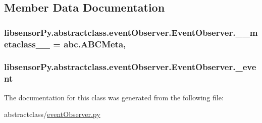\subsection{Member Data Documentation}
\hypertarget{classlibsensorPy_1_1abstractclass_1_1eventObserver_1_1EventObserver_a78c1baeecb96b95af9e0947d62d05450}{}
\subsubsection[{\+\_\+\+\_\+metaclass\+\_\+\+\_\+}]{\setlength{\rightskip}{0pt plus 5cm}libsensor\+Py.\+abstractclass.\+event\+Observer.\+Event\+Observer.\+\_\+\+\_\+metaclass\+\_\+\+\_\+ = abc.\+A\+B\+C\+Meta\hspace{0.3cm}{\ttfamily [static]}, {\ttfamily [private]}}\label{classlibsensorPy_1_1abstractclass_1_1eventObserver_1_1EventObserver_a78c1baeecb96b95af9e0947d62d05450}
\hypertarget{classlibsensorPy_1_1abstractclass_1_1eventObserver_1_1EventObserver_a7a1e08b9e92cec21bf6f7e60ac863d40}{}
\subsubsection[{\+\_\+event}]{\setlength{\rightskip}{0pt plus 5cm}libsensor\+Py.\+abstractclass.\+event\+Observer.\+Event\+Observer.\+\_\+event\hspace{0.3cm}{\ttfamily [private]}}\label{classlibsensorPy_1_1abstractclass_1_1eventObserver_1_1EventObserver_a7a1e08b9e92cec21bf6f7e60ac863d40}


The documentation for this class was generated from the following file\+:\begin{DoxyCompactItemize}
\item 
abstractclass/\hyperlink{eventObserver_8py}{event\+Observer.\+py}\end{DoxyCompactItemize}

